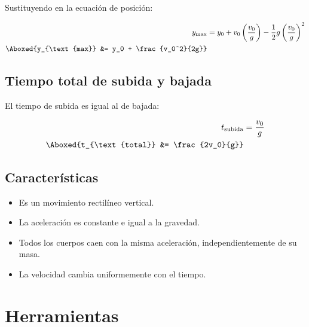 Sustituyendo en la ecuación de posición:

\vspace{-20pt}

\begin{align*}
y_{\text{max}} &= y_0 + v_0\left(\frac{v_0}{g}\right) - \frac{1}{2}g\left(\frac{v_0}{g}\right)^2 \\
\Aboxed{y_{\text{max}} &= y_0 + \frac{v_0^2}{2g}}
\end{align*}

\subsection{Tiempo total de subida y bajada}

El tiempo de subida es igual al de bajada:

\vspace{-20pt}

\begin{align*}
t_{\text{subida}} &= \frac{v_0}{g} \\
\Aboxed{t_{\text{total}} &= \frac{2v_0}{g}}
\end{align*}

\subsection{Características}

\begin{itemize}
    \setlength{\itemsep}{0pt}
    \item Es un movimiento rectilíneo vertical.
    \item La aceleración es constante e igual a la gravedad.
    \item Todos los cuerpos caen con la misma aceleración, independientemente de su masa.
    \item La velocidad cambia uniformemente con el tiempo.
\end{itemize}


\section{Herramientas}

